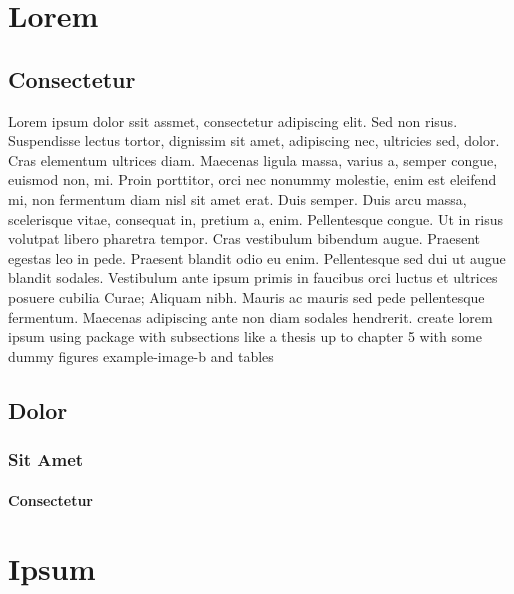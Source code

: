 \documentclass{skripsi}
\begin{document}
 
\maketitle
\frontmatter
\onehalfspacing
\tableofcontents
\listoffigures
\listoftables
\mainmatter
\pagestyle{fancyplain}
\onehalfspacing
\chapter{Lorem}
\section{Consectetur}
Lorem ipsum dolor ssit assmet, consectetur adipiscing elit. Sed non risus. Suspendisse lectus tortor, dignissim sit amet, adipiscing nec, ultricies sed, dolor. Cras elementum ultrices diam. Maecenas ligula massa, varius a, semper congue, euismod non, mi. Proin porttitor, orci nec nonummy molestie, enim est eleifend mi, non fermentum diam nisl sit amet erat. Duis semper. Duis arcu massa, scelerisque vitae, consequat in, pretium a, enim. Pellentesque congue. Ut in risus volutpat libero pharetra tempor. Cras vestibulum bibendum augue. Praesent egestas leo in pede. Praesent blandit odio eu enim. Pellentesque sed dui ut augue blandit sodales. Vestibulum ante ipsum primis in faucibus orci luctus et ultrices posuere cubilia Curae; Aliquam nibh. Mauris ac mauris sed pede pellentesque fermentum. Maecenas adipiscing ante non diam sodales hendrerit.
create lorem ipsum using package with subsections like a thesis up to chapter 5 with some dummy figures example-image-b and tables
\section{Dolor}
\lipsum[1-3]
\subsection{Sit Amet}
\lipsum[4-6]
\subsubsection{Consectetur}
\lipsum[7-9]

\chapter{Ipsum}
\end{document}

